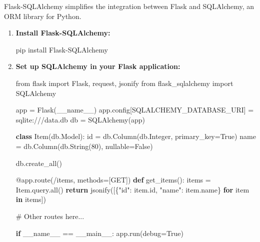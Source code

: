 \documentclass[
  letterpaper,
  DIV=11,
  numbers=noendperiod]{scrreprt}
\newenvironment{Shaded}{\begin{snugshade}}{\end{snugshade}}
\newcommand{\AttributeTok}[1]{\textcolor[rgb]{0.40,0.45,0.13}{#1}}
\newcommand{\BuiltInTok}[1]{\textcolor[rgb]{0.00,0.23,0.31}{#1}}
\newcommand{\CommentTok}[1]{\textcolor[rgb]{0.37,0.37,0.37}{#1}}
\newcommand{\ControlFlowTok}[1]{\textcolor[rgb]{0.00,0.23,0.31}{\textbf{#1}}}
\newcommand{\DecValTok}[1]{\textcolor[rgb]{0.68,0.00,0.00}{#1}}
\newcommand{\ExtensionTok}[1]{\textcolor[rgb]{0.00,0.23,0.31}{#1}}
\newcommand{\ImportTok}[1]{\textcolor[rgb]{0.00,0.46,0.62}{#1}}
\newcommand{\KeywordTok}[1]{\textcolor[rgb]{0.00,0.23,0.31}{\textbf{#1}}}
\newcommand{\NormalTok}[1]{\textcolor[rgb]{0.00,0.23,0.31}{#1}}
\newcommand{\OperatorTok}[1]{\textcolor[rgb]{0.37,0.37,0.37}{#1}}
\newcommand{\StringTok}[1]{\textcolor[rgb]{0.13,0.47,0.30}{#1}}
\newcommand{\VariableTok}[1]{\textcolor[rgb]{0.07,0.07,0.07}{#1}}
\begin{document}
Flask-SQLAlchemy simplifies the integration between Flask and
SQLAlchemy, an ORM library for Python.

\begin{enumerate}
\def\labelenumi{\arabic{enumi}.}
\item
  \textbf{Install Flask-SQLAlchemy:}

\begin{Shaded}
\begin{Highlighting}[]
\ExtensionTok{pip}\NormalTok{ install Flask{-}SQLAlchemy}
\end{Highlighting}
\end{Shaded}
\item
  \textbf{Set up SQLAlchemy in your Flask application:}

\begin{Shaded}
\begin{Highlighting}[]
\ImportTok{from}\NormalTok{ flask }\ImportTok{import}\NormalTok{ Flask, request, jsonify}
\ImportTok{from}\NormalTok{ flask\_sqlalchemy }\ImportTok{import}\NormalTok{ SQLAlchemy}

\NormalTok{app }\OperatorTok{=}\NormalTok{ Flask(}\VariableTok{\_\_name\_\_}\NormalTok{)}
\NormalTok{app.config[}\StringTok{\textquotesingle{}SQLALCHEMY\_DATABASE\_URI\textquotesingle{}}\NormalTok{] }\OperatorTok{=} \StringTok{\textquotesingle{}sqlite:///data.db\textquotesingle{}}
\NormalTok{db }\OperatorTok{=}\NormalTok{ SQLAlchemy(app)}

\KeywordTok{class}\NormalTok{ Item(db.Model):}
    \BuiltInTok{id} \OperatorTok{=}\NormalTok{ db.Column(db.Integer, primary\_key}\OperatorTok{=}\VariableTok{True}\NormalTok{)}
\NormalTok{    name }\OperatorTok{=}\NormalTok{ db.Column(db.String(}\DecValTok{80}\NormalTok{), nullable}\OperatorTok{=}\VariableTok{False}\NormalTok{)}

\NormalTok{db.create\_all()}

\AttributeTok{@app.route}\NormalTok{(}\StringTok{\textquotesingle{}/items\textquotesingle{}}\NormalTok{, methods}\OperatorTok{=}\NormalTok{[}\StringTok{\textquotesingle{}GET\textquotesingle{}}\NormalTok{])}
\KeywordTok{def}\NormalTok{ get\_items():}
\NormalTok{    items }\OperatorTok{=}\NormalTok{ Item.query.}\BuiltInTok{all}\NormalTok{()}
    \ControlFlowTok{return}\NormalTok{ jsonify([\{}\StringTok{"id"}\NormalTok{: item.}\BuiltInTok{id}\NormalTok{, }\StringTok{"name"}\NormalTok{: item.name\} }\ControlFlowTok{for}\NormalTok{ item }\KeywordTok{in}\NormalTok{ items])}

\CommentTok{\# Other routes here...}

\ControlFlowTok{if} \VariableTok{\_\_name\_\_} \OperatorTok{==} \StringTok{\textquotesingle{}\_\_main\_\_\textquotesingle{}}\NormalTok{:}
\NormalTok{    app.run(debug}\OperatorTok{=}\VariableTok{True}\NormalTok{)}
\end{Highlighting}
\end{Shaded}
\end{enumerate}
\end{document}

